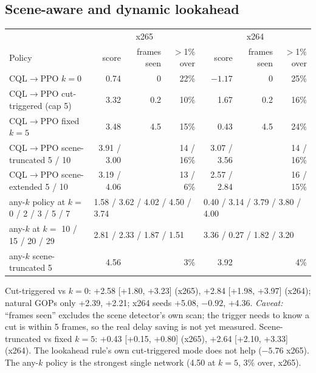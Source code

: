 \documentclass[10pt,a4paper]{article}
\begin{document}
\subsection{Scene-aware and dynamic lookahead}
\begin{center}\small
\begin{tabular}{lrrr|rrr}
\toprule
& \multicolumn{3}{c|}{x265} & \multicolumn{3}{c}{x264} \\
Policy & score & frames seen & $>$1\% over & score & frames seen & $>$1\% over \\\midrule
CQL$\to$PPO $k=0$ & 0.74 & 0 & 22\% & $-1.17$ & 0 & 25\% \\
CQL$\to$PPO cut-triggered (cap 5) & 3.32 & 0.2 & 10\% & 1.67 & 0.2 & 16\% \\
CQL$\to$PPO fixed $k=5$ & 3.48 & 4.5 & 15\% & 0.43 & 4.5 & 24\% \\
CQL$\to$PPO scene-truncated 5 / 10 & 3.91 / 3.00 & & 14 / 16\% & 3.07 / 3.56 & & 14 / 16\% \\
CQL$\to$PPO scene-extended 5 / 10 & 3.19 / 4.06 & & 13 / 6\% & 2.57 / 2.84 & & 16 / 15\% \\
any-$k$ policy at $k=$ 0 / 2 / 3 / 5 / 7 & \multicolumn{3}{l|}{1.58 / 3.62 / 4.02 / 4.50 / 3.74} & \multicolumn{3}{l}{0.40 / 3.14 / 3.79 / 3.80 / 4.00} \\
any-$k$ at $k=$ 10 / 15 / 20 / 29 & \multicolumn{3}{l|}{2.81 / 2.33 / 1.87 / 1.51} & \multicolumn{3}{l}{3.36 / 0.27 / 1.82 / 3.20} \\
any-$k$ scene-truncated 5 & 4.56 & & 3\% & 3.92 & & 4\% \\
\bottomrule
\end{tabular}
\end{center}
Cut-triggered vs $k=0$: +2.58 [+1.80, +3.23] (x265), +2.84 [+1.98, +3.97] (x264); natural GOPs only +2.39, +2.21;
x264 seeds +5.08, $-0.92$, +4.36. \emph{Caveat:} ``frames seen'' excludes the scene detector's own scan; the trigger
needs to know a cut is within 5 frames, so the real delay saving is not yet measured. Scene-truncated vs fixed
$k=5$: +0.43 [+0.15, +0.80] (x265), +2.64 [+2.10, +3.33] (x264). The lookahead rule's own cut-triggered mode does not
help ($-5.76$ x265). The any-$k$ policy is the strongest single network (4.50 at $k=5$, 3\% over, x265).
\end{document}
